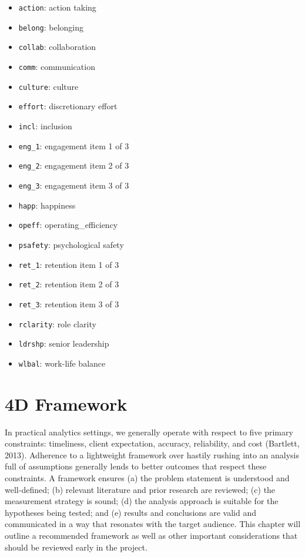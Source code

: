 \documentclass[
]{book}
\providecommand{\tightlist}{%
  \setlength{\itemsep}{0pt}\setlength{\parskip}{0pt}}
\begin{document}
\begin{itemize}
\tightlist
\item
  \texttt{action}: action taking
\item
  \texttt{belong}: belonging
\item
  \texttt{collab}: collaboration
\item
  \texttt{comm}: communication
\item
  \texttt{culture}: culture
\item
  \texttt{effort}: discretionary effort
\item
  \texttt{incl}: inclusion
\item
  \texttt{eng\_1}: engagement item 1 of 3
\item
  \texttt{eng\_2}: engagement item 2 of 3
\item
  \texttt{eng\_3}: engagement item 3 of 3
\item
  \texttt{happ}: happiness
\item
  \texttt{opeff}: operating\_efficiency
\item
  \texttt{psafety}: psychological safety
\item
  \texttt{ret\_1}: retention item 1 of 3
\item
  \texttt{ret\_2}: retention item 2 of 3
\item
  \texttt{ret\_3}: retention item 3 of 3
\item
  \texttt{rclarity}: role clarity
\item
  \texttt{ldrshp}: senior leadership
\item
  \texttt{wlbal}: work-life balance
\end{itemize}

\hypertarget{d-framework}{%
\section{4D Framework}\label{d-framework}}

In practical analytics settings, we generally operate with respect to five primary constraints: timeliness, client expectation, accuracy, reliability, and cost (Bartlett, 2013). Adherence to a lightweight framework over hastily rushing into an analysis full of assumptions generally lends to better outcomes that respect these constraints. A framework ensures (a) the problem statement is understood and well-defined; (b) relevant literature and prior research are reviewed; (c) the measurement strategy is sound; (d) the analysis approach is suitable for the hypotheses being tested; and (e) results and conclusions are valid and communicated in a way that resonates with the target audience. This chapter will outline a recommended framework as well as other important considerations that should be reviewed early in the project.
\end{document}
